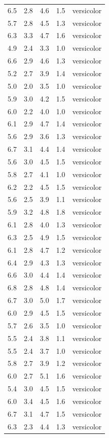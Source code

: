 \documentclass[
  letterpaper,
  DIV=11,
  numbers=noendperiod,
  oneside]{scrreprt}
\begin{document}
\begin{longtable}[]{@{}rrrrl@{}}
6.5 & 2.8 & 4.6 & 1.5 & versicolor \\
5.7 & 2.8 & 4.5 & 1.3 & versicolor \\
6.3 & 3.3 & 4.7 & 1.6 & versicolor \\
4.9 & 2.4 & 3.3 & 1.0 & versicolor \\
6.6 & 2.9 & 4.6 & 1.3 & versicolor \\
5.2 & 2.7 & 3.9 & 1.4 & versicolor \\
5.0 & 2.0 & 3.5 & 1.0 & versicolor \\
5.9 & 3.0 & 4.2 & 1.5 & versicolor \\
6.0 & 2.2 & 4.0 & 1.0 & versicolor \\
6.1 & 2.9 & 4.7 & 1.4 & versicolor \\
5.6 & 2.9 & 3.6 & 1.3 & versicolor \\
6.7 & 3.1 & 4.4 & 1.4 & versicolor \\
5.6 & 3.0 & 4.5 & 1.5 & versicolor \\
5.8 & 2.7 & 4.1 & 1.0 & versicolor \\
6.2 & 2.2 & 4.5 & 1.5 & versicolor \\
5.6 & 2.5 & 3.9 & 1.1 & versicolor \\
5.9 & 3.2 & 4.8 & 1.8 & versicolor \\
6.1 & 2.8 & 4.0 & 1.3 & versicolor \\
6.3 & 2.5 & 4.9 & 1.5 & versicolor \\
6.1 & 2.8 & 4.7 & 1.2 & versicolor \\
6.4 & 2.9 & 4.3 & 1.3 & versicolor \\
6.6 & 3.0 & 4.4 & 1.4 & versicolor \\
6.8 & 2.8 & 4.8 & 1.4 & versicolor \\
6.7 & 3.0 & 5.0 & 1.7 & versicolor \\
6.0 & 2.9 & 4.5 & 1.5 & versicolor \\
5.7 & 2.6 & 3.5 & 1.0 & versicolor \\
5.5 & 2.4 & 3.8 & 1.1 & versicolor \\
5.5 & 2.4 & 3.7 & 1.0 & versicolor \\
5.8 & 2.7 & 3.9 & 1.2 & versicolor \\
6.0 & 2.7 & 5.1 & 1.6 & versicolor \\
5.4 & 3.0 & 4.5 & 1.5 & versicolor \\
6.0 & 3.4 & 4.5 & 1.6 & versicolor \\
6.7 & 3.1 & 4.7 & 1.5 & versicolor \\
6.3 & 2.3 & 4.4 & 1.3 & versicolor \\

\end{longtable}
\end{document}
